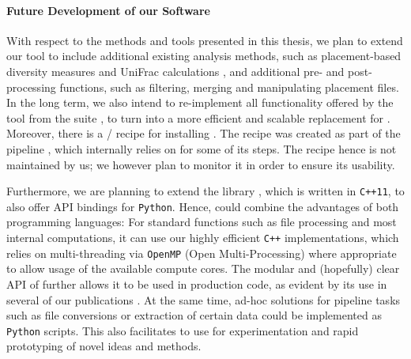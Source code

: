 
\paragraph{Future Development of our Software}
\label{ch:ConclusionOutlook:sec:UsabilityScalability:par:FutureOfOurSoftware}

With respect to the methods and tools presented in this thesis,
we plan to extend our  tool \cite{Czech2019-genesis-gappa} to include additional existing analysis methods,
such as placement-based diversity measures \cite{Matsen2010} and UniFrac calculations \cite{Lozupone2005},
and additional pre- and post-processing functions, such as filtering, merging and manipulating placement files.
In the long term, we also intend to re-implement all functionality offered by the
 tool from the  suite \cite{Matsen2010},
to turn  into a more efficient and scalable replacement for .
Moreover, there is a / \cite{Gruning2018} recipe
for installing  \cite{Douglas2018-gappa}.
The recipe was created as part of the  pipeline \cite{Douglas2019},
which internally relies on  for some of its steps.
The recipe hence is not maintained by us;
we however plan to monitor it in order to ensure its usability.

Furthermore, we are planning to extend the  library \cite{Czech2019-genesis-gappa},
which is written in \texttt{C++11}, to also offer \acs{API} bindings for \texttt{Python}.
Hence,  could combine the advantages of both programming languages:
For standard functions such as file processing and most internal computations,
it can use our highly efficient \texttt{C++} implementations,
which relies on multi-threading via \texttt{OpenMP} (Open Multi-Processing)
where appropriate to allow usage of the available compute cores.
The modular and (hopefully) clear \acs{API} of  further allows it to be used in production code,
as evident by its use in several of our publications
\cite{Mahe2017,Barbera2018,Zhou2017,Czech2018-phat,Czech2019-analysis,Czech2019-genesis-gappa}.
At the same time, ad-hoc solutions for pipeline tasks such as file conversions or extraction of certain data
could be implemented as \texttt{Python} scripts.
This also facilitates to use  for experimentation and rapid prototyping of novel ideas and methods.

